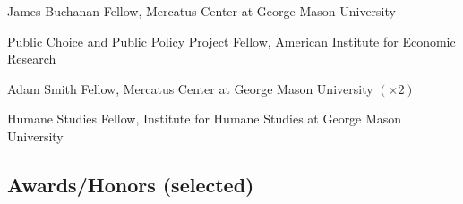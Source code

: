 \documentclass[12pt,letterpaper]{report}
\begin{document}
    \begin{tablist}
            \item[2024-25]   \tab James Buchanan Fellow, Mercatus Center at George Mason University
                   \item[2021--]   \tab Public Choice and Public Policy Project Fellow, American Institute for Economic Research
    	\item [2017-19] \tab Adam Smith Fellow, Mercatus Center at George Mason University $(\times 2)$
    	\item [2018-19] \tab Humane Studies Fellow, Institute for Humane Studies at George Mason University

    \end{tablist}

\subsection*{Awards/Honors (selected)}
\end{document}
